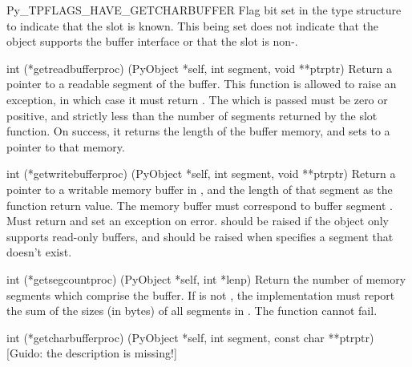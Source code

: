 \begin{datadesc}{Py_TPFLAGS_HAVE_GETCHARBUFFER}
  Flag bit set in the type structure to indicate that the
   slot is known.  This being set does not
  indicate that the object supports the buffer interface or that the
   slot is non-\NULL.
\end{datadesc}

\begin{ctypedesc}[getreadbufferproc]{int (*getreadbufferproc)
                            (PyObject *self, int segment, void **ptrptr)}
  Return a pointer to a readable segment of the buffer.  This function
  is allowed to raise an exception, in which case it must return
  .  The  which is passed must be zero or
  positive, and strictly less than the number of segments returned by
  the  slot function.  On success, it returns
  the length of the buffer memory, and sets  to a
  pointer to that memory.
\end{ctypedesc}

\begin{ctypedesc}[getwritebufferproc]{int (*getwritebufferproc)
                            (PyObject *self, int segment, void **ptrptr)}
  Return a pointer to a writable memory buffer in
  , and the length of that segment as the function
  return value.  The memory buffer must correspond to buffer segment
  .  Must return  and set an exception on
  error.   should be raised if the object only
  supports read-only buffers, and  should be
  raised when  specifies a segment that doesn't exist.
\end{ctypedesc}

\begin{ctypedesc}[getsegcountproc]{int (*getsegcountproc)
                            (PyObject *self, int *lenp)}
  Return the number of memory segments which comprise the buffer.  If
   is not \NULL, the implementation must report the sum of
  the sizes (in bytes) of all segments in .
  The function cannot fail.
\end{ctypedesc}

\begin{ctypedesc}[getcharbufferproc]{int (*getcharbufferproc)
                            (PyObject *self, int segment, const char **ptrptr)}
[Guido: the description is missing!]
\end{ctypedesc}


